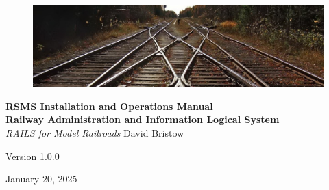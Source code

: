 \documentclass[letterpaper, oneside, 11pt]{book}
\begin{document}
\begin{titlepage}
	\raggedleft
	\begin{figure}[H]
	\centering
		\includegraphics[scale=1.53]{railway_track.jpg}
	\label{fig:track}
\end{figure}
	\vspace*{0.167\textheight}
	\textbf{\LARGE RSMS Installation and Operations Manual}\\[\baselineskip]
    \textbf{\textcolor{MyBlue}{\Huge R\Large ailway \Huge A\Large dministration and \Huge I\Large nformation \Huge L\Large ogical \Huge S\Large ystem}}\\[\baselineskip]
	{\Large \textit{RAILS for Model Railroads}}
	\vfill
    \vspace*{\baselineskip}
	{\small David Bristow}

	{\small Version 1.0.0}
	
	{\small January 20, 2025}
	\vspace*{3\baselineskip}
\end{titlepage}
\tableofcontents




\backmatter

\printnoidxglossary[sort=letter]
\end{document}
